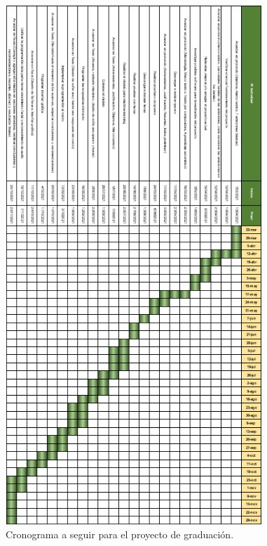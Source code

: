 \begin{figure}[h]
    \centering
    \includegraphics[width=0.86\textwidth]{cronograma.png}
    \caption{Cronograma a seguir para el proyecto de graduación.}
    \label{fig:Cronograma}
\end{figure}